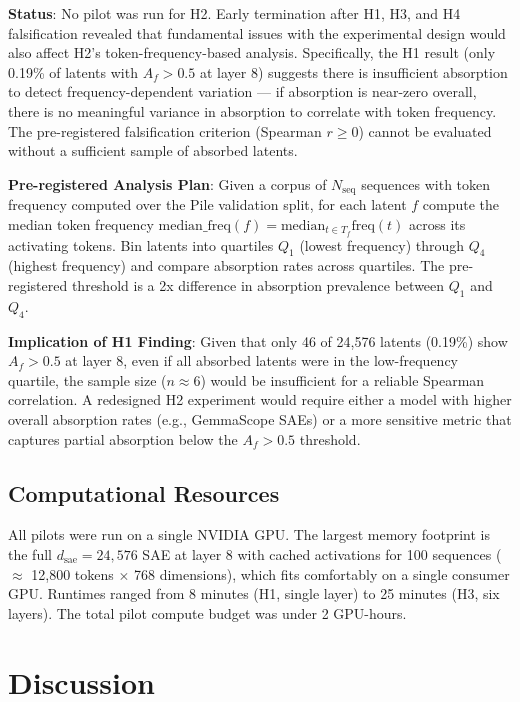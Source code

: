 \documentclass{article}
\begin{document}
\textbf{Status}: No pilot was run for H2. Early termination after H1, H3, and H4 falsification revealed that fundamental issues with the experimental design would also affect H2's token-frequency-based analysis. Specifically, the H1 result (only 0.19\% of latents with $A_f > 0.5$ at layer 8) suggests there is insufficient absorption to detect frequency-dependent variation --- if absorption is near-zero overall, there is no meaningful variance in absorption to correlate with token frequency. The pre-registered falsification criterion (Spearman $r \geq 0$) cannot be evaluated without a sufficient sample of absorbed latents.

\textbf{Pre-registered Analysis Plan}: Given a corpus of $N_{\text{seq}}$ sequences with token frequency computed over the Pile validation split, for each latent $f$ compute the median token frequency $\text{median\_freq}(f) = \text{median}_{t \in T_f} \text{freq}(t)$ across its activating tokens. Bin latents into quartiles $Q_1$ (lowest frequency) through $Q_4$ (highest frequency) and compare absorption rates across quartiles. The pre-registered threshold is a 2x difference in absorption prevalence between $Q_1$ and $Q_4$.

\textbf{Implication of H1 Finding}: Given that only 46 of 24,576 latents (0.19\%) show $A_f > 0.5$ at layer 8, even if all absorbed latents were in the low-frequency quartile, the sample size ($n \approx 6$) would be insufficient for a reliable Spearman correlation. A redesigned H2 experiment would require either a model with higher overall absorption rates (e.g., GemmaScope SAEs) or a more sensitive metric that captures partial absorption below the $A_f > 0.5$ threshold.

\subsection{Computational Resources}

All pilots were run on a single NVIDIA GPU. The largest memory footprint is the full $d_{\text{sae}} = 24{,}576$ SAE at layer 8 with cached activations for 100 sequences ($\approx$ 12,800 tokens $\times$ 768 dimensions), which fits comfortably on a single consumer GPU. Runtimes ranged from 8 minutes (H1, single layer) to 25 minutes (H3, six layers). The total pilot compute budget was under 2 GPU-hours.


\section{Discussion}
\end{document}

